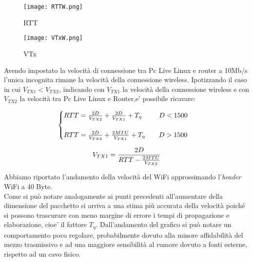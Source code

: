 \documentclass[../lab2.tex]{subfiles}
\begin{document}
    \begin{figure}[!htb]
        \begin{minipage}{0.48\textwidth}
            \centering
            \texttt{[image: RTTW.png]}
            \vspace{-20pt}
            \caption{RTT}\label{RTTW}
        \end{minipage}\hfill
        \begin{minipage}{0.48\textwidth}
            \centering
            \texttt{[image: VTxW.png]}
            \vspace{-20pt}
            \caption{VTx}\label{VTxW}
        \end{minipage}
    \end{figure}

    Avendo impostato la velocità di connessione tra Pc Live Linux e router a 10Mb/s
    l'unica incognita rimane la velocità della connessione wireless.
    Ipotizzando il caso in cui $V_{TX1} < V_{TX2}$, indicando con $V_{TX1}$ la velocità della connessione wireless 
    e con $V_{TX2}$ la velocità tra Pc Live Linux e Router,e' possibile ricavare:

    \begin{equation}
        \centering
        \begin{cases}
            RTT = \frac{2D}{V_{TX2}} +\frac{2D}{V_{TX1}} + T_\eta  \qquad \, \, \, D < 1500 \\
            \\
            RTT = \frac{2D}{V_{TX2}} +\frac{2MTU}{V_{TX1}} + T_\eta  \qquad D > 1500
        \end{cases}
    \end{equation}

    \begin{equation}
        \centering
        V_{TX1} = \frac{2D}{RTT - \frac{2MTU}{V_{TX2}}} 
    \end{equation}
    
    \vspace{10pt}

    Abbiamo riportato l'andamento della velocità del WiFi approssimando l'\textit{header} WiFi a
    40 Byte. \\
    Come si può notare analogamente ai punti precedenti all'aumentare della dimensione
    del pacchetto si arriva a una stima più accurata della velocità poiché si possono 
    trascurare con meno margine di errore i tempi di propagazione e elaborazione, 
    cioe' il fattore $T_\eta$.
    Dall'andamento del grafico si può notare un comportamento poco
    regolare, probabilmente dovuto alla minore affidabilità del mezzo trasmissivo 
    e ad una maggiore sensibilità al rumore dovuto a fonti esterne, 
    rispetto ad un cavo fisico.
\end{document}
